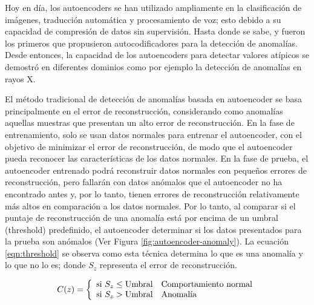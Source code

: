 Hoy en día, los autoencoders se han utilizado ampliamente en la clasificación de imágenes, traducción automática y procesamiento de voz; esto debido a su capacidad de compresión de datos sin supervisión. Hasta donde se sabe,  y  fueron los primeros que propusieron autocodificadores para la detección de anomalías. Desde entonces, la capacidad de los autoencoders para detectar valores at\'{i}picos se demostró en diferentes dominios como por ejemplo la detecci\'{o}n de anomal\'{i}as en rayos X.

\vspace{5mm} %

El m\'{e}todo tradicional de detecci\'{o}n de anomal\'{i}as basada en autoencoder se basa principalmente en el error de reconstrucci\'{o}n, considerando como anomal\'{i}as aquellas muestras que presentan un alto error de reconstrucci\'{o}n. En la fase de entrenamiento, solo se usan datos normales para entrenar el autoencoder, con el objetivo de minimizar el error de reconstrucci\'{o}n, de modo que el autoencoder pueda reconocer las caracter\'{i}sticas de los datos normales. En la fase de prueba, el autoencoder entrenado podr\'{a} reconstruir datos normales con peque\~{n}os errores de reconstrucci\'{o}n, pero fallar\'{a}n con datos an\'{o}malos que el autoencoder no ha encontrado antes y, por lo tanto, tienen errores de reconstrucci\'{o}n relativamente m\'{a}s altos en comparaci\'{o}n a los datos normales. Por lo tanto, al comparar si el puntaje de reconstrucci\'{o}n de una anomal\'{i}a est\'{a} por encima de un umbral (threshold) predefinido, el autoencoder determinar si los datos presentados para la prueba son an\'{o}malos \cite{Reference47} (Ver Figura \ref{fig:autoencoder-anomaly}). La ecuaci\'{o}n \ref{eqn:threshold} se observa como esta t\'{e}cnica determina lo que es una anomal\'{i}a y lo que no lo es; donde $S_{z}$ representa el error de reconstrucci\'{o}n.

\begin{equation}
C(z) = \left\lbrace
\begin{array}{ll}
\textup{si } S_{z}\leq \textup{Umbral} & \textup{Comportamiento normal}\\
\textup{si } S_{z}> \textup{Umbral} & \textup{Anomal\'{i}a}
\end{array}
\right.
\label{eqn:threshold}
\end{equation}

